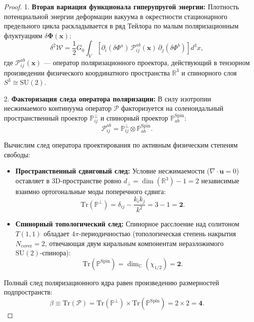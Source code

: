 \documentclass[12pt,a4paper]{article}
\begin{document}
	\begin{proof}
		1. \textbf{Вторая вариация функционала гиперупругой энергии:}
		Плотность потенциальной энергии деформации вакуума в окрестности стационарного предельного цикла раскладывается в ряд Тейлора по малым поляризационным флуктуациям $\delta \boldsymbol{\Phi}(\mathbf{x})$:
		\begin{equation}
			\delta^2 \mathcal{W} = \frac{1}{2} G_0 \int_{V} \left[ \partial_i (\delta \Phi^a) \, \mathcal{P}_{ij}^{ab}(\mathbf{x}) \, \partial_j (\delta \Phi^b) \right] d^3x,
		\end{equation}
		где $\mathcal{P}_{ij}^{ab}(\mathbf{x})$ --- оператор поляризационного проектора, действующий в тензорном произведении физического координатного пространства $\mathbb{R}^3$ и спинорного слоя $S^3 \cong \mathrm{SU}(2)$.
		
		2. \textbf{Факторизация следа оператора поляризации:}
		В силу изотропии несжимаемого континуума оператор $\mathcal{P}$ факторизуется на соленоидальный пространственный проектор $\mathbb{P}^\perp_{ij}$ и спинорный проектор $\mathbb{P}^{\mathrm{Spin}}_{ab}$:
		\begin{equation}
			\mathcal{P}_{ij}^{ab} = \mathbb{P}^\perp_{ij} \otimes \mathbb{P}^{\mathrm{Spin}}_{ab}.
		\end{equation}
		
		Вычислим след оператора проектирования по активным физическим степеням свободы:
		\begin{itemize}
			\item \textbf{Пространственный сдвиговый след:} Условие несжимаемости ($\nabla \cdot \mathbf{u} = 0$) оставляет в 3D-пространстве ровно $d_\perp = \dim(\mathbb{R}^3) - 1 = 2$ независимые взаимно ортогональные моды поперечного сдвига:
			\begin{equation}
				\mathrm{Tr}(\mathbb{P}^\perp) = \delta_{ij} - \frac{k_i k_j}{k^2} = 3 - 1 = \mathbf{2}.
			\end{equation}
			\item \textbf{Спинорный топологический след:} Спинорное расслоение над солитоном $T(1,1)$ обладает $4\pi$-периодичностью (топологическая степень накрытия $N_{\text{cover}} = 2$, отвечающая двум киральным компонентам неразложимого $\mathrm{SU}(2)$-спинора):
			\begin{equation}
				\mathrm{Tr}(\mathbb{P}^{\mathrm{Spin}}) = \dim_{\mathbb{C}}(\chi_{1/2}) = \mathbf{2}.
			\end{equation}
		\end{itemize}
		Полный след поляризационного ядра равен произведению размерностей подпространств:
		\begin{equation}
			\beta \equiv \mathrm{Tr}\left( \mathcal{P} \right) = \mathrm{Tr}(\mathbb{P}^\perp) \times \mathrm{Tr}(\mathbb{P}^{\mathrm{Spin}}) = 2 \times 2 = \mathbf{4}.
		\end{equation}
		

\end{proof}
\end{document}
